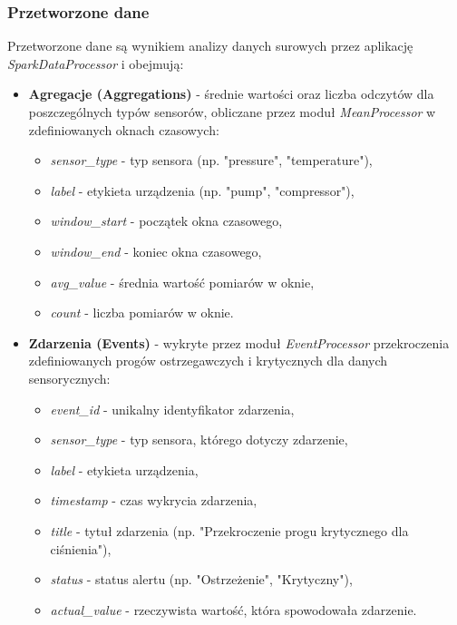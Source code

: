 \newpage

\subsubsection{Przetworzone dane}
\label{subsubsec:przetworzone_dane}

Przetworzone dane są wynikiem analizy danych surowych przez aplikację \textit{SparkDataProcessor} i obejmują:

\begin{itemize}
    \setlength\itemsep{0.5em}
    \item \textbf{Agregacje (Aggregations)} - średnie wartości oraz liczba odczytów dla poszczególnych typów sensorów, obliczane przez moduł \textit{MeanProcessor} w zdefiniowanych oknach czasowych:
    \begin{itemize}
        \item \textit{sensor\_type} - typ sensora (np. "pressure", "temperature"),
        \item \textit{label} - etykieta urządzenia (np. "pump", "compressor"),
        \item \textit{window\_start} - początek okna czasowego,
        \item \textit{window\_end} - koniec okna czasowego,
        \item \textit{avg\_value} - średnia wartość pomiarów w oknie,
        \item \textit{count} - liczba pomiarów w oknie.
    \end{itemize}
    
    \item \textbf{Zdarzenia (Events)} - wykryte przez moduł \textit{EventProcessor} przekroczenia zdefiniowanych progów ostrzegawczych i krytycznych dla danych sensorycznych:
    \begin{itemize}
        \item \textit{event\_id} - unikalny identyfikator zdarzenia,
        \item \textit{sensor\_type} - typ sensora, którego dotyczy zdarzenie,
        \item \textit{label} - etykieta urządzenia,
        \item \textit{timestamp} - czas wykrycia zdarzenia,
        \item \textit{title} - tytuł zdarzenia (np. "Przekroczenie progu krytycznego dla ciśnienia"),
        \item \textit{status} - status alertu (np. "Ostrzeżenie", "Krytyczny"),
        \item \textit{actual\_value} - rzeczywista wartość, która spowodowała zdarzenie.
    \end{itemize}
    

\end{itemize}
